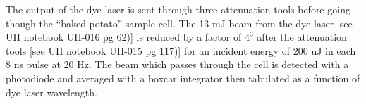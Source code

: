 \label{absorbtion layout}
The output of the dye laser is sent through three attenuation tools before going though the ``baked potato'' sample cell. The 13 mJ beam from the dye laser [see UH notebook UH-016 pg 62)] is reduced by a factor of $4^3$ after the attenuation tools [see UH notebook UH-015 pg 117)] for an incident energy of 200 uJ in each 8 ns pulse at 20 Hz. The beam which passes through the cell is detected with a photodiode and averaged with a boxcar integrator then tabulated as a function of dye laser wavelength.
